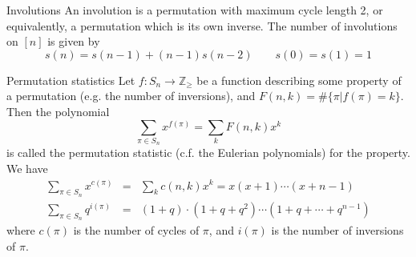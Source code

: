\begin{algorithm}{Involutions}
\keyword{}
\desc
An involution is a permutation with maximum cycle length 2, or
equivalently, a permutation which is its own inverse.  The number of
involutions on $[n]$ is given by
$$s(n) = s(n-1) + (n-1)s(n-2) \qquad s(0) = s(1) = 1$$
\end{algorithm}

\begin{algorithm}{Permutation statistics}
\keyword{}
\desc
Let $f: S_n \rightarrow \mathbb{Z}_{\ge}$ be a function describing
some property of a permutation (e.g. the number of inversions), and
$F(n,k) = \#\{\pi | f(\pi) = k\}$.  Then the polynomial
$$\sum_{\pi \in S_n} x^{f(\pi)} = \sum_{k} F(n,k) x^k$$ 
is called the permutation statistic (c.f. the Eulerian polynomials)
for the property. We have
\begin{eqnarray*}
\sum_{\pi \in S_n} x^{c(\pi)} & = & \sum_{k} c(n,k) x^k = x (x+1) \cdots (x+n-1)\\
\sum_{\pi \in S_n} q^{i(\pi)} & = & (1 + q)\cdot(1+q+q^2) \cdots (1 + q + \cdots + q^{n-1})
\end{eqnarray*}
where $c(\pi)$ is the number of cycles of $\pi$, and $i(\pi)$ is the
number of inversions of $\pi$.
\end{algorithm}
